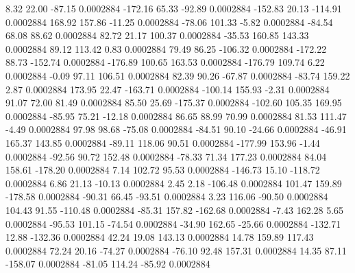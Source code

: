        8.32       22.00      -87.15     0.0002884
     -172.16       65.33      -92.89     0.0002884
     -152.83       20.13     -114.91     0.0002884
      168.92      157.86      -11.25     0.0002884
      -78.06      101.33       -5.82     0.0002884
      -84.54       68.08       88.62     0.0002884
       82.72       21.17      100.37     0.0002884
      -35.53      160.85      143.33     0.0002884
       89.12      113.42        0.83     0.0002884
       79.49       86.25     -106.32     0.0002884
     -172.22       88.73     -152.74     0.0002884
     -176.89      100.65      163.53     0.0002884
     -176.79      109.74        6.22     0.0002884
       -0.09       97.11      106.51     0.0002884
       82.39       90.26      -67.87     0.0002884
      -83.74      159.22        2.87     0.0002884
      173.95       22.47     -163.71     0.0002884
     -100.14      155.93       -2.31     0.0002884
       91.07       72.00       81.49     0.0002884
       85.50       25.69     -175.37     0.0002884
     -102.60      105.35      169.95     0.0002884
      -85.95       75.21      -12.18     0.0002884
       86.65       88.99       70.99     0.0002884
       81.53      111.47       -4.49     0.0002884
       97.98       98.68      -75.08     0.0002884
      -84.51       90.10      -24.66     0.0002884
      -46.91      165.37      143.85     0.0002884
      -89.11      118.06       90.51     0.0002884
     -177.99      153.96       -1.44     0.0002884
      -92.56       90.72      152.48     0.0002884
      -78.33       71.34      177.23     0.0002884
       84.04      158.61     -178.20     0.0002884
        7.14      102.72       95.53     0.0002884
     -146.73       15.10     -118.72     0.0002884
        6.86       21.13      -10.13     0.0002884
        2.45        2.18     -106.48     0.0002884
      101.47      159.89     -178.58     0.0002884
      -90.31       66.45      -93.51     0.0002884
        3.23      116.06      -90.50     0.0002884
      104.43       91.55     -110.48     0.0002884
      -85.31      157.82     -162.68     0.0002884
       -7.43      162.28        5.65     0.0002884
      -95.53      101.15      -74.54     0.0002884
      -34.90      162.65      -25.66     0.0002884
     -132.71       12.88     -132.36     0.0002884
       42.24       19.08      143.13     0.0002884
       14.78      159.89      117.43     0.0002884
       72.24       20.16      -74.27     0.0002884
      -76.10       92.48      157.31     0.0002884
       14.35       87.11     -158.07     0.0002884
      -81.05      114.24      -85.92     0.0002884
